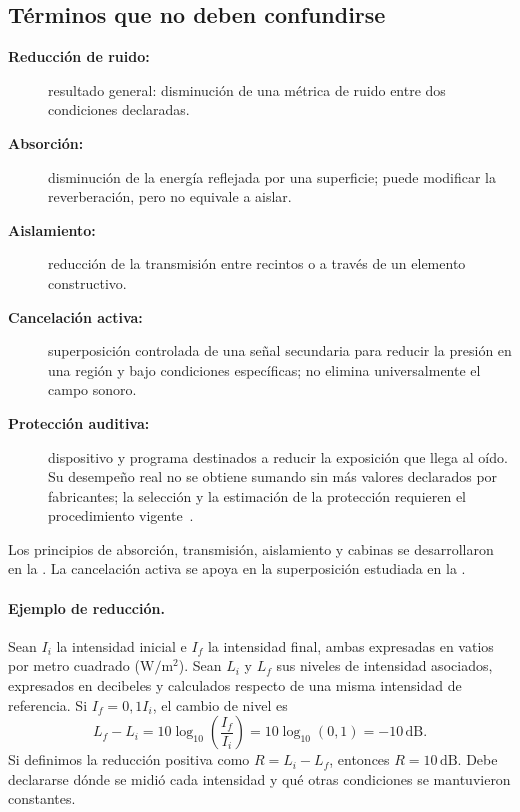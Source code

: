 \subsection{Términos que no deben confundirse}

\begin{description}
    \item[\textbf{Reducción de ruido:}] resultado general: disminución de una
    métrica de ruido entre dos condiciones declaradas.
    \item[\textbf{Absorción:}] disminución de la energía reflejada por una
    superficie; puede modificar la reverberación, pero no equivale a aislar.
    \item[\textbf{Aislamiento:}] reducción de la transmisión entre recintos o
    a través de un elemento constructivo.
    \item[\textbf{Cancelación activa:}] superposición controlada de una señal
    secundaria para reducir la presión en una región y bajo condiciones
    específicas; no elimina universalmente el campo sonoro.
    \item[\textbf{Protección auditiva:}] dispositivo y programa
    destinados a reducir la exposición que llega al oído. Su desempeño real
    no se obtiene sumando sin más valores declarados por fabricantes; la
    selección y la estimación de la protección requieren el procedimiento
    vigente~\cite{iso4869_2_2018}.
\end{description}

Los principios de absorción, transmisión, aislamiento y cabinas se
desarrollaron en la . La cancelación activa se apoya
en la superposición estudiada en la .

\paragraph{Ejemplo de reducción.}
Sean \(I_i\) la intensidad inicial e \(I_f\) la intensidad final, ambas
expresadas en vatios por metro cuadrado (\(\mathrm{W/m^2}\)). Sean \(L_i\) y
\(L_f\) sus niveles de intensidad asociados, expresados en decibeles y
calculados respecto de una misma intensidad de referencia. Si
\(I_f=0{,}1I_i\), el cambio de nivel es
\[
L_f-L_i
=10\log_{10}\left(\frac{I_f}{I_i}\right)
=10\log_{10}(0{,}1)=-10\,\mathrm{dB}.
\]
Si definimos la reducción positiva como
\(R=L_i-L_f\), entonces
\(R=10\,\mathrm{dB}\). Debe declararse dónde se midió cada intensidad y qué
otras condiciones se mantuvieron constantes.

